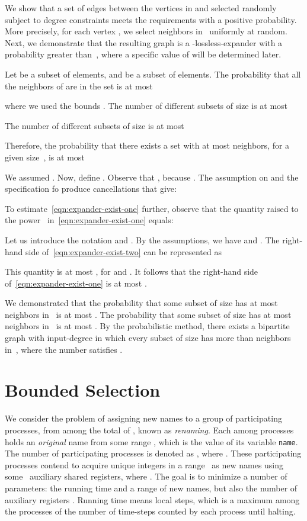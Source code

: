 \documentclass[11pt]{article}
\newcommand{\qed}{\hfill  \smallbreak}
\newenvironment{proof}{\noindent{\bf Proof:}}{\qed}
\begin{document}
\begin{proof} 
We show that a set of edges between the vertices in  and  selected randomly subject to degree constraints meets the requirements with a positive probability.
More precisely, for each vertex , we select   neighbors in~ uniformly at random.
Next, we demonstrate that the resulting graph is  a -lossless-expander with a probability greater than~, where a specific value of  will be determined later.

Let   be  a subset of  elements, and  be a subset of  elements.
The probability that all the neighbors of  are in the set  is at most

where we used the bounds .
The number of different subsets  of size  is at most

The number of different subsets  of size  is at most

Therefore, the probability that there exists a set  with at most  neighbors, for a given size~,  is at most 

We assumed .
Now, define .
Observe that , because . 
The assumption on  and the specification fo  produce cancellations that give:

To estimate~\eqref{eqn:expander-exist-one} further, observe that the quantity raised to the power~ in~\eqref{eqn:expander-exist-one} equals:

Let us introduce the notation  and .
By the assumptions, we have  and .
The right-hand side of~\eqref{eqn:expander-exist-two} can be represented as

This quantity is at most , for  and .
It follows that the right-hand side of~\eqref{eqn:expander-exist-one} is at most .

We demonstrated that the probability that some subset  of size  has at most  neighbors in~ is at most .
The probability that some  subset  of size  has at most  neighbors in~ is at most .
By the probabilistic method, there exists a bipartite graph  with input-degree  in which every subset  of size  has more than  neighbors in~, where the number  satisfies .
\end{proof} 






\section{Bounded Selection}


We consider the problem of assigning new names to a group of participating processes, from among the total of , known as \emph{renaming}.
Each among  processes holds an \emph{original} name from some range , which is the value of its variable \texttt{name}.
The number of participating processes is denoted as , where .
These participating processes contend to acquire unique integers in a range~  as new names using some~ auxiliary shared registers, where . 
The goal is to minimize a number of parameters: the running time and a range  of new names, but also the number of auxiliary registers .
Running time means local steps, which is a maximum among the processes of the number of time-steps counted by each process until halting. 
\end{document}
